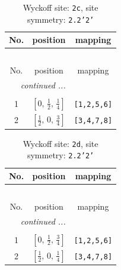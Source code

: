 \documentclass[fleqn,8pt]{jsarticle}
\begin{document}
\renewcommand{\arraystretch}{1.2}
\begin{longtable}{ccc}
\caption{Wyckoff site: {\tt 2c}, site symmetry: {\tt 2.2'2'}}
 \\
 \hline \hline
No. & position & mapping \\ \hline \endfirsthead

\multicolumn{2}{l}{\tablename\ \thetable{}} \\
 \hline \hline
No. & position & mapping \\ \hline \endhead

 \hline \hline
\multicolumn{2}{r}{\footnotesize\it continued ...} \\ \endfoot

 \hline \hline
\multicolumn{2}{r}{} \\ \endlastfoot

1 & $\left[ 0,\, \frac{1}{2},\, \frac{1}{4} \right]$ & {\tt [1,2,5,6]} \\ \hline
2 & $\left[ \frac{1}{2},\, 0,\, \frac{3}{4} \right]$ & {\tt [3,4,7,8]} \\
\end{longtable}
\renewcommand{\arraystretch}{1.2}
\begin{longtable}{ccc}
\caption{Wyckoff site: {\tt 2d}, site symmetry: {\tt 2.2'2'}}
 \\
 \hline \hline
No. & position & mapping \\ \hline \endfirsthead

\multicolumn{2}{l}{\tablename\ \thetable{}} \\
 \hline \hline
No. & position & mapping \\ \hline \endhead

 \hline \hline
\multicolumn{2}{r}{\footnotesize\it continued ...} \\ \endfoot

 \hline \hline
\multicolumn{2}{r}{} \\ \endlastfoot

1 & $\left[ 0,\, \frac{1}{2},\, \frac{3}{4} \right]$ & {\tt [1,2,5,6]} \\ \hline
2 & $\left[ \frac{1}{2},\, 0,\, \frac{1}{4} \right]$ & {\tt [3,4,7,8]} \\
\end{longtable}
\renewcommand{\arraystretch}{1.2}
\end{document}
